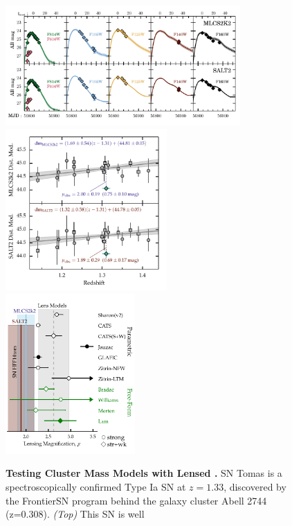 \documentclass[12pt]{article}
\begin{document}
\begin{figure}
\centering
\includegraphics[width=0.8\textwidth]{FIG/snTomas_lightcurve_fit_magAB}
\includegraphics[width=0.55\textwidth]{FIG/snTomas_hubble_diagram}
\includegraphics[width=0.44\textwidth]{FIG/snTomas_magnifications}%
\caption{ \label{fig:tomas} \small {\bf Testing Cluster Mass Models
    with Lensed \SNIa.}  SN Tomas is a spectroscopically confirmed
  Type Ia SN at $z=1.33$, discovered by the FrontierSN program behind
  the galaxy cluster Abell 2744 (z=0.308).  {\it(Top)} This SN is well
}
\end{figure}
\end{document}
